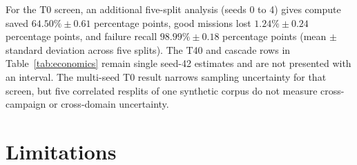 \documentclass[preprint,12pt,authoryear,doubleblind]{elsarticle}
\begin{document}
For the T0 screen, an additional five-split analysis (seeds 0 to 4) gives compute saved $64.50\%\pm0.61$ percentage points, good missions lost $1.24\%\pm0.24$ percentage points, and failure recall $98.99\%\pm0.18$ percentage points (mean $\pm$ standard deviation across five splits). The T40 and cascade rows in Table~\ref{tab:economics} remain single seed-42 estimates and are not presented with an interval. The multi-seed T0 result narrows sampling uncertainty for that screen, but five correlated resplits of one synthetic corpus do not measure cross-campaign or cross-domain uncertainty.

\section{Limitations}
\label{sec:limitations}
\end{document}

